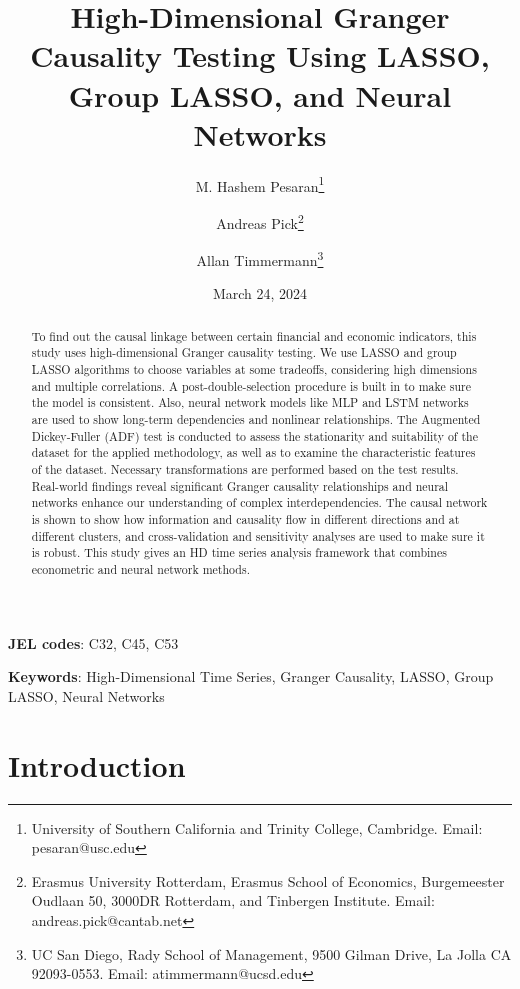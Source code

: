 \documentclass[11pt]{article}
\title{High-Dimensional Granger Causality Testing Using LASSO, Group LASSO, and Neural Networks}
\author{M. Hashem Pesaran\thanks{University of Southern California and Trinity College, Cambridge. Email: pesaran@usc.edu} \and Andreas Pick\thanks{Erasmus University Rotterdam, Erasmus School of Economics, Burgemeester Oudlaan 50, 3000DR Rotterdam, and Tinbergen Institute. Email: andreas.pick@cantab.net} \and Allan Timmermann\thanks{UC San Diego, Rady School of Management, 9500 Gilman Drive, La Jolla CA 92093-0553. Email: atimmermann@ucsd.edu}}
\date{March 24, 2024}
\begin{document}
\maketitle

\begin{abstract}
To find out the causal linkage between certain financial and economic indicators, this study uses high-dimensional Granger causality testing. We use LASSO and group LASSO algorithms to choose variables at some tradeoffs, considering high dimensions and multiple correlations. A post-double-selection procedure is built in to make sure the model is consistent. Also, neural network models like MLP and LSTM networks are used to show long-term dependencies and nonlinear relationships. The Augmented Dickey-Fuller (ADF) test is conducted to assess the stationarity and suitability of the dataset for the applied methodology, as well as to examine the characteristic features of the dataset. Necessary transformations are performed based on the test results. Real-world findings reveal significant Granger causality relationships and neural networks enhance our understanding of complex interdependencies. The causal network is shown to show how information and causality flow in different directions and at different clusters, and cross-validation and sensitivity analyses are used to make sure it is robust. This study gives an HD time series analysis framework that combines econometric and neural network methods.
\end{abstract}

\noindent\textbf{JEL codes}: C32, C45, C53

\noindent \textbf{Keywords}: High-Dimensional Time Series, Granger Causality, LASSO, Group LASSO, Neural Networks

\newpage
\section{Introduction}
\end{document}
